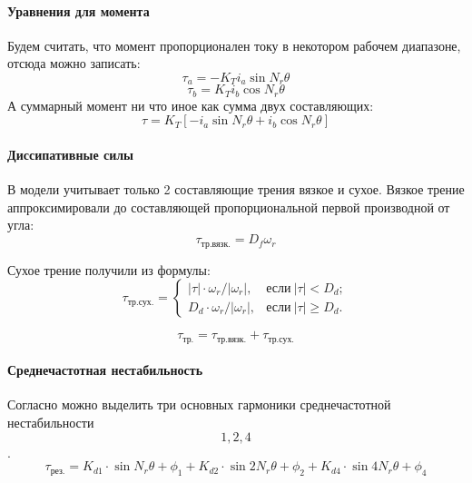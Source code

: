 \paragraph{ Уравнения для момента }
Будем считать, что момент пропорционален току в некотором рабочем диапазоне, отсюда можно записать:
$$
    \tau_{a} = - K_{T} i_{a} \sin{N_{r} \theta}
$$
$$
    \tau_{b} = K_{T} i_{b} \cos{N_{r} \theta}
$$
А суммарный момент ни что иное как сумма двух составляющих:
\begin{equation}
    \tau = K_{T} [-i_{a} \sin{N_{r}\theta} + i_{b} \cos{N_{r}\theta}]
\end{equation}


\paragraph{ Диссипативные силы }
В модели учитывает только 2 составляющие трения вязкое и сухое.
Вязкое трение аппроксимировали до составляющей пропорциональной первой производной от угла:
\begin{equation}
    \tau_{\text{тр.вязк.}} = D_{f} \omega_{r}
\end{equation}

Сухое трение получили из формулы:
\begin{equation}
    \tau_{\text{тр.сух.}} = \begin{cases}
         |\tau| \cdot {\omega_{r}}/{|\omega_{r}|}, & \text{если} ~|\tau|  <  D_{d}; \\[2mm]
         D_{d}  \cdot {\omega_{r}}/{|\omega_{r}|}, & \text{если} ~|\tau| \ge D_{d}.
    \end{cases}
\end{equation}

\begin{equation}
    \tau_{\text{тр.}} = \tau_{\text{тр.вязк.}} + \tau_{\text{тр.сух.}}
\end{equation}


\paragraph{ Среднечастотная нестабильность }
Согласно \cite[ур.(5)]{Novel_Modeling_and_Damping} можно выделить три основных
гармоники среднечастотной нестабильности \[1, 2, 4\].
\begin{equation}
    \tau_{\text{рез.}} =   K_{d1} \cdot \sin{   N_{r} \theta + \phi_{1} }
                         + K_{d2} \cdot \sin{ 2 N_{r} \theta + \phi_{2} }
                         + K_{d4} \cdot \sin{ 4 N_{r} \theta + \phi_{4} }
\end{equation}

